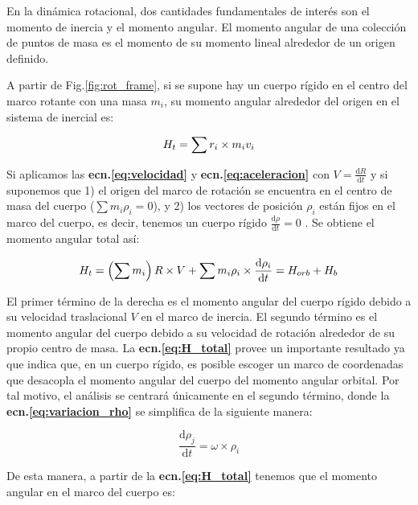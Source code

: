 En la dinámica rotacional, dos cantidades fundamentales de interés son el momento de inercia y el momento angular. El momento angular de una colección de puntos de masa es el momento de su momento lineal alrededor de un origen definido.

A partir de Fig.\ref{fig:rot_frame}, si se supone hay un cuerpo rígido en el centro del marco rotante con una masa $m_i$, su momento angular alrededor del origen en el sistema de inercial es:

\begin{equation}
	H_{t}=\sum r_i \times m_i v_i\\
\end{equation}

Si aplicamos las \textbf{ecn.\eqref{eq:velocidad}} y \textbf{ecn.\eqref{eq:aceleracion}} con $V =\frac{\mathrm{d} {R}}{\mathrm{d} t}$ y si suponemos que 1) el origen del marco de rotación se encuentra en el centro de masa del cuerpo ($\sum m_i\rho_i =0$), y 2) los vectores de posición $\rho_i$ están fijos en el marco del cuerpo, es decir, tenemos un cuerpo rígido $\frac{\mathrm{d} {\rho}}{\mathrm{d} t} =0$ . Se obtiene el momento angular total así:

\begin{equation}\label{eq:H_total}
H_{t}=\left(\sum m_i\right)R\times V +\sum m_i \rho_i\times\frac{\mathrm{d} {\rho_i}}{\mathrm{d} t} = H_{orb} + H_b \\
\end{equation}

El primer término de la derecha es el momento angular del cuerpo rígido debido a su velocidad traslacional $V$ en el marco de inercia. El segundo término es el momento angular del cuerpo debido a su velocidad de rotación alrededor de su propio centro de masa. La \textbf{ecn.\eqref{eq:H_total}} provee un importante resultado ya que indica que, en un cuerpo rígido, es posible escoger un marco de coordenadas que desacopla el momento angular del cuerpo del momento angular orbital.
Por tal motivo, el análisis se centrará únicamente en el segundo término, donde la \textbf{ecn.\eqref{eq:variacion_rho}} se simplifica de la siguiente manera: 

\begin{equation}\label{eq:variacion_rho_simplificada}
	\frac{\mathrm{d} \rho_j}{\mathrm{d} t}=\omega\times\rho_i
\end{equation}

De esta manera, a partir de la \textbf{ecn.\eqref{eq:H_total}} tenemos que el momento angular en el marco del cuerpo es:

